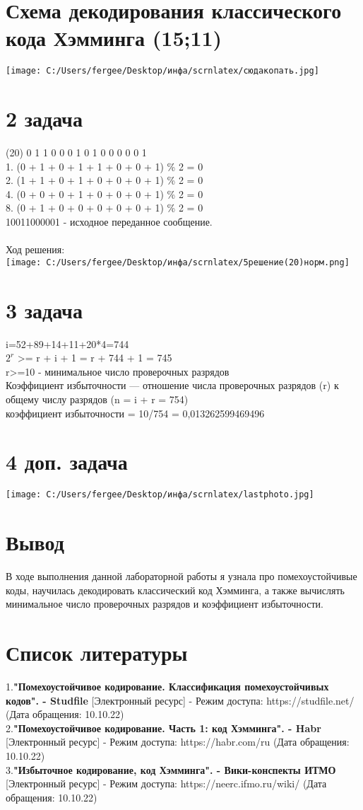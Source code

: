 \documentclass[a4paper]{article}
\begin{document}
\section{Схема декодирования классического кода Хэмминга (15;11)}
\texttt{[image: C:/Users/fergee/Desktop/инфа/scrnlatex/сюдакопать.jpg]}
\newpage
\section{2 задача}
(20) 0 1 1 0 0 0 1 0 1 0 0 0 0 0 1 \\
   1. (0 + 1 + 0 + 1 + 1 + 0 + 0 + 1) \% 2 = 0\\
   2. (1 + 1 + 0 + 1 + 0 + 0 + 0 + 1) \% 2 = 0\\
   4. (0 + 0 + 0 + 1 + 0 + 0 + 0 + 1) \% 2 = 0 \\
   8. (0 + 1 + 0 + 0 + 0 + 0 + 0 + 1) \% 2 = 0\\ 
   10011000001 - исходное переданное сообщение.
\\
\\
Ход решения:
\\
\texttt{[image: C:/Users/fergee/Desktop/инфа/scrnlatex/5решение(20)норм.png]}
\section{3 задача}
i=52+89+14+11+20*4=744
\\
$2^r$ >= r + i + 1 = r + 744 + 1 = 745
\\
r>=10 - минимальное число проверочных разрядов 
\\
Коэффициент избыточности — отношение числа проверочных разрядов (r) к общему числу разрядов (n = i + r = 754)
\\
коэффициент избыточности = 10/754 = 0,013262599469496
\section{4 доп. задача}
\texttt{[image: C:/Users/fergee/Desktop/инфа/scrnlatex/lastphoto.jpg]}
\newpage
\section{Вывод}
В ходе выполнения данной лабораторной работы я узнала про помехоустойчивые коды, научилась декодировать классический код Хэмминга, а также вычислять минимальное число проверочных разрядов и коэффициент избыточности.
\newpage
\section{Список литературы}
1.\textbf{"Помехоустойчивое кодирование. Классификация помехоустойчивых кодов". - Studfile} [Электронный ресурс] - Режим доступа: https://studfile.net/ (Дата обращения: 10.10.22)\\
2.\textbf{"Помехоустойчивое кодирование. Часть 1: код Хэмминга". - Habr} [Электронный ресурс] - Режим доступа: https://habr.com/ru (Дата обращения: 10.10.22)\\
3.\textbf{"Избыточное кодирование, код Хэмминга". - Вики-конспекты ИТМО} [Электронный ресурс] - Режим доступа: https://neerc.ifmo.ru/wiki/ (Дата обращения: 10.10.22)\\
\end{document}
